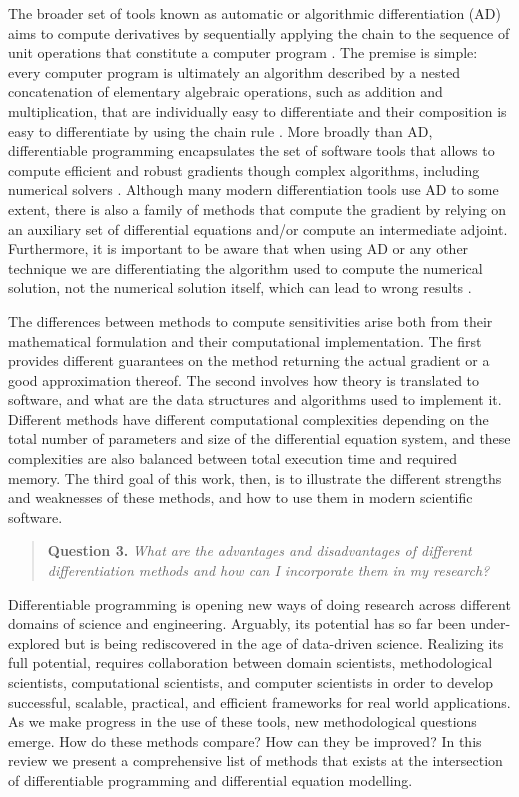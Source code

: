 The broader set of tools known as automatic or algorithmic differentiation (AD) aims to compute derivatives by sequentially applying the chain to the sequence of unit operations that constitute a computer program \cite{Griewank:2008kh, Naumann.2011}. 
The premise is simple: every computer program is ultimately an algorithm described by a nested concatenation of elementary algebraic operations, such as addition and multiplication, that are individually easy to differentiate and their composition is easy to differentiate by using the chain rule \cite{Giering:1998in}. 
More broadly than AD, differentiable programming encapsulates the set of software tools that allows to compute efficient and robust gradients though complex algorithms, including numerical solvers \cite{Innes_Zygote}. 
Although many modern differentiation tools use AD to some extent, there is also a family of methods that compute the gradient by relying on an auxiliary set of differential equations and/or compute an intermediate adjoint. 
Furthermore, it is important to be aware that when using AD or any other technique we are differentiating the algorithm used to compute the numerical solution, not the numerical solution itself, which can lead to wrong results \cite{Eberhard_Bischof_1996}.

The differences between methods to compute sensitivities arise both from their mathematical formulation and their computational implementation. 
The first provides different guarantees on the method returning the actual gradient or a good approximation thereof. 
The second involves how theory is translated to software, and what are the data structures and algorithms used to implement it. 
Different methods have different computational complexities depending on the total number of parameters and size of the differential equation system, and these complexities are also balanced between total execution time and required memory. 
The third goal of this work, then, is to illustrate the different strengths and weaknesses of these methods, and how to use them in modern scientific software. 
\begin{quote}
    \textbf{Question 3. }
    \textit{What are the advantages and disadvantages of different differentiation methods and how can I incorporate them in my research?}
\end{quote}

Differentiable programming is opening new ways of doing research across different domains of science and engineering. 
Arguably, its potential has so far been under-explored but is being rediscovered in the age of data-driven science. 
Realizing its full potential, requires collaboration between domain scientists, methodological scientists, computational scientists, and computer scientists in order to develop successful, scalable, practical, and efficient frameworks for real world applications.
As we make progress in the use of these tools, new methodological questions emerge. 
How do these methods compare? How can they be improved? 
In this review we present a comprehensive list of methods that exists at the intersection of differentiable programming and differential equation modelling. 

